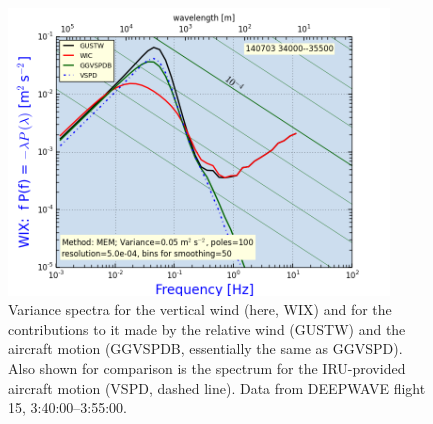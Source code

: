 \documentclass[12pt,twoside,english]{article}\usepackage[]{graphicx}\usepackage[]{color}
\begin{document}
\begin{figure}
\noindent \begin{centering}
\includegraphics[width=0.9\textwidth]{SpecialGraphics/WIXHR1.png}  
\par\end{centering}

\protect\caption[Variance spectra for the vertical wind and for the contributions made by the relative wind and the aircraft motion.]{\label{fig:WIXHR1}Variance spectra for the vertical wind (here, WIX) and for the contributions to it made by the relative wind (GUSTW) and the aircraft motion (GGVSPDB, essentially the same as GGVSPD). Also shown for comparison is the spectrum for the IRU-provided aircraft motion (VSPD, dashed line). Data from DEEPWAVE flight 15, 3:40:00--3:55:00.} 
\end{figure}
\end{document}

